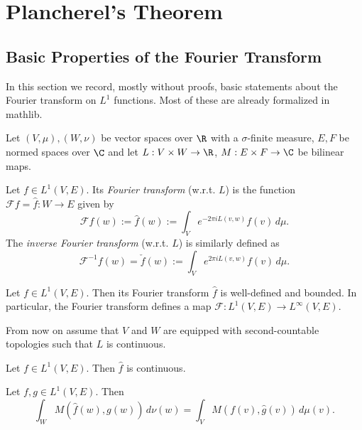 \chapter{Plancherel's Theorem}
\label{chap:plancherel}
\section{Basic Properties of the Fourier Transform}
In this section we record, mostly without proofs, basic statements about the Fourier transform on
$L^1$ functions. Most of these are already formalized in mathlib.

Let $(V,\mu),(W,\nu)$ be vector spaces over $\R$ with a $\sigma$-finite measure,
$E,F$ be normed spaces over $\C$ and let $L:V\times W\to \R$, $M:E\times F\to\C$
be bilinear maps.
\begin{definition}
  \label{def:fourier-transform}
  \uses{}
  \leanok
  Let $f\in L^1(V,E)$. Its \emph{Fourier transform} (w.r.t. $L$) is the function
  $\mathcal Ff=\widehat f:W\to E$ given by
  $$\mathcal Ff(w):=\widehat f(w):=\int_V e^{-2\pi i L(v,w)}f(v)\,d\mu.$$
  The \emph{inverse Fourier transform} (w.r.t. $L$) is similarly defined as
  $$\mathcal F^{-1}f(w)=\check f(w):=\int_Ve^{2\pi iL(v,w)}f(v)\,d\mu.$$
\end{definition}

\begin{lemma}
  \label{lem:fourier-bounded}
  \leanok
  Let $f\in L^1(V,E)$. Then its Fourier transform $\widehat f$ is well-defined and bounded.
  In particular, the Fourier transform defines a map $\mathcal F:L^1(V,E)\to L^\infty(V,E)$.
\end{lemma}

From now on assume that $V$ and $W$ are equipped with second-countable topologies such that
$L$ is continuous.
\begin{lemma}
  \label{lem:fourier-cont}
  \leanok
  Let $f\in L^1(V,E)$. Then $\widehat f$ is continuous.
\end{lemma}

\begin{lemma}
\label{lem:fourier-multiplication}
\leanok
Let $f,g\in L^1(V,E)$. Then
$$\int_WM(\widehat f(w),g(w))\,d\nu(w)=\int_VM(f(v),\widehat g(v))\,d\mu(v).$$
\end{lemma}

